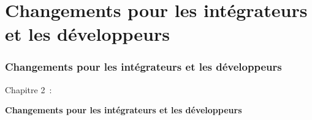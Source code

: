 %

\section{Changements pour les intégrateurs et les développeurs}
\begin{frame}[fragile]
	\frametitle{Changements pour les intégrateurs et les développeurs}

	\begin{center}\huge{Chapitre 2~:}\end{center}
	\begin{center}\huge{\color{typo3darkgrey}\textbf{Changements pour les intégrateurs et les développeurs}}\end{center}

\end{frame}



